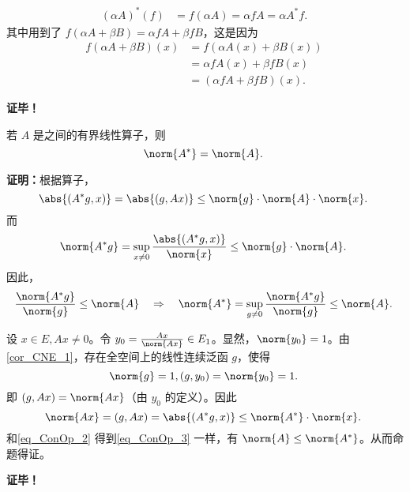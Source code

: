 \begin{equation}
\begin{aligned}
(\alpha A)^*(f)&=f(\alpha A)=\alpha fA=\alpha A^*f.
\end{aligned}~
\end{equation}
其中用到了 $f(\alpha A+\beta B)=\alpha fA+\beta fB$，这是因为
\begin{equation}
\begin{aligned}
f(\alpha A+\beta B)(x)&=f(\alpha A(x)+\beta B(x))\\
&=\alpha fA(x)+\beta fB(x)\\
&=(\alpha fA+\beta fB)(x).
\end{aligned}~
\end{equation}

\textbf{证毕！}



\begin{theorem}{}
若 $A$ 是之间的有界线性算子，则
\begin{equation}
\norm{A^*}=\norm{A}.~
\end{equation}

\end{theorem}

\textbf{证明：}根据算子，
\begin{equation}\label{eq_ConOp_2}
\abs{(A^*g,x)}=\abs{(g,Ax)}\leq\norm{g}\cdot\norm{A}\cdot\norm{x}.~
\end{equation}
而 
\begin{equation}
\norm{A^*g}=\sup_{x\neq0} \frac{\abs{(A^*g,x)}}{\norm{x}}\leq\norm{g}\cdot\norm{A}.~
\end{equation}
因此，
\begin{equation}\label{eq_ConOp_3}
\frac{\norm{A^*g}}{\norm{g}}\leq\norm{A}\quad\Rightarrow\quad \norm{A^*}=\sup_{g\neq0}\frac{\norm{A^*g}}{\norm{g}}\leq\norm{A}.~
\end{equation}

设 $x\in E,Ax\neq0$。令 $y_0=\frac{Ax}{\norm{Ax}}\in E_1$。显然，$\norm{y_0}=1$。由\autoref{cor_CNE_1}，存在全空间上的线性连续泛函 $g$，使得 
\begin{equation}
\norm{g}=1,(g,y_0)=\norm{y_0}=1.~
\end{equation}
即 $(g,Ax)=\norm{Ax}$（由 $y_0$ 的定义）。因此
\begin{equation}
\norm{Ax}=(g,Ax)=\abs{(A^*g,x)}\leq\norm{A^*}\cdot\norm{x}.~
\end{equation}
和\autoref{eq_ConOp_2} 得到\autoref{eq_ConOp_3} 一样，有 $\norm{A}\leq\norm{A^*}$。从而命题得证。

\textbf{证毕！}


